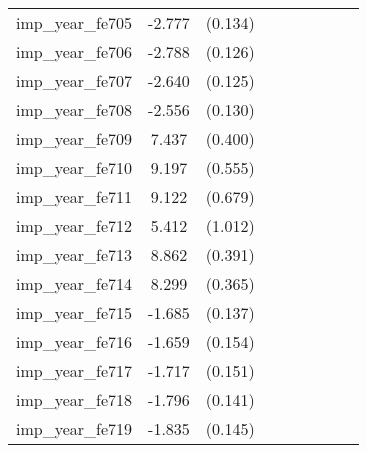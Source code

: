 {\begin{tabular}{l*{4}{cc}}
imp\_year\_fe705&   -2.777\sym{***}&  (0.134)&                  &         &                  &         &                  &         \\
imp\_year\_fe706&   -2.788\sym{***}&  (0.126)&                  &         &                  &         &                  &         \\
imp\_year\_fe707&   -2.640\sym{***}&  (0.125)&                  &         &                  &         &                  &         \\
imp\_year\_fe708&   -2.556\sym{***}&  (0.130)&                  &         &                  &         &                  &         \\
imp\_year\_fe709&    7.437\sym{***}&  (0.400)&                  &         &                  &         &                  &         \\
imp\_year\_fe710&    9.197\sym{***}&  (0.555)&                  &         &                  &         &                  &         \\
imp\_year\_fe711&    9.122\sym{***}&  (0.679)&                  &         &                  &         &                  &         \\
imp\_year\_fe712&    5.412\sym{***}&  (1.012)&                  &         &                  &         &                  &         \\
imp\_year\_fe713&    8.862\sym{***}&  (0.391)&                  &         &                  &         &                  &         \\
imp\_year\_fe714&    8.299\sym{***}&  (0.365)&                  &         &                  &         &                  &         \\
imp\_year\_fe715&   -1.685\sym{***}&  (0.137)&                  &         &                  &         &                  &         \\
imp\_year\_fe716&   -1.659\sym{***}&  (0.154)&                  &         &                  &         &                  &         \\
imp\_year\_fe717&   -1.717\sym{***}&  (0.151)&                  &         &                  &         &                  &         \\
imp\_year\_fe718&   -1.796\sym{***}&  (0.141)&                  &         &                  &         &                  &         \\
imp\_year\_fe719&   -1.835\sym{***}&  (0.145)&                  &         &                  &         &                  &         \\

\end{tabular}}
